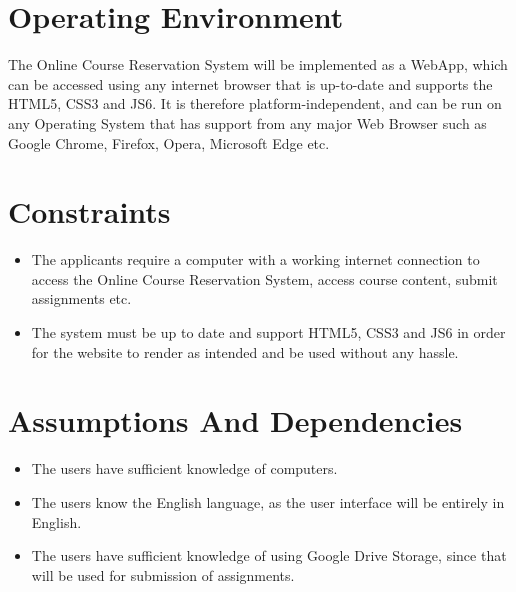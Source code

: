 \documentclass[12pt, a4]{report}
\begin{document}

\section{Operating Environment}
The Online Course Reservation System will be implemented as a WebApp, which can be accessed using any internet browser that is up-to-date and supports the HTML5, CSS3 and JS6. It is therefore platform-independent, and can be run on any Operating System that has support from any major Web Browser such as Google Chrome, Firefox, Opera, Microsoft Edge etc.

\section{Constraints}
\begin{itemize}
    \item The applicants require a computer with a working internet connection to access the Online Course Reservation System, access course content, submit assignments etc.
    \item The system must be up to date and support HTML5, CSS3 and JS6 in order for the website to render as intended and be used without any hassle.
\end{itemize}


\section{Assumptions And Dependencies}
\begin{itemize}
    \item The users have sufficient knowledge of computers.
    \item The users know the English language, as the user interface will be entirely in English.
    \item The users have sufficient knowledge of using Google Drive Storage, since that will be used for submission of assignments.
\end{itemize}

\end{document}
